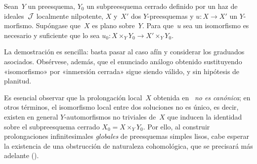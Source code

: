 \begin{lemme}
\label{III.4.2}
Sean~$Y$ un preesquema, $Y_0$ un subpreesquema cerrado definido por un haz de ideales~$\cal{J}$ localmente nilpotente, $X$ y~$X'$ dos $Y$-preesquemas y $u\colon X\to X'$ un $Y$-morfismo. Supóngase que~$X$ es plano sobre~$Y$. Para que~$u$ sea un isomorfismo es necesario y suficiente que lo sea $u_0\colon X\times_Y Y_0\to X'\times_Y Y_0$.
\end{lemme}

La demostración es sencilla: basta pasar al caso afín y considerar los graduados asociados. Obsérvese, además, que el enunciado análogo obtenido sustituyendo «isomorfismo» por «inmersión cerrada» sigue siendo válido, y sin hipótesis de planitud.

\begin{remarque}
\label{III.4.3}
Es esencial observar que la prolongación local~$X$ obtenida en~ \emph{no es canónica}; en otros términos, el isomorfismo local entre dos soluciones no es único, es decir, existen en general $Y$-automorfismos no triviales de~$X$ que inducen la identidad sobre el subpreesquema cerrado $X_0=X\times_Y Y_0$. Por ello, al construir prolongaciones infinitesimales \emph{globales} de preesquemas
{simples}
{lisos},
cabe esperar la existencia de una obstrucción de naturaleza cohomológica, que se precisará más adelante (\no {}).
\end{remarque}
